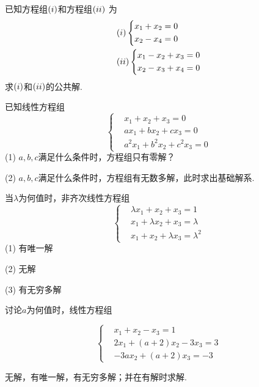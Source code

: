 \begin{ex}\label{5.16}
已知方程组$(\romannumeral 1)$和方程组$(\romannumeral 2)$ 为
\begin{displaymath}\begin{aligned}&
(\romannumeral 1)\left\{ \begin{aligned}&x_1+x_2=0\\&x_2-x_4=0\end{aligned}\right.\\ &
(\romannumeral 2)\left\{ \begin{aligned}&x_1-x_2+x_3=0\\&x_2-x_3+x_4=0\end{aligned}\right.\end{aligned}
\end{displaymath}
求$(\romannumeral 1)$和$(\romannumeral 2)$的公共解.
\end{ex}

\begin{ex}\label{5.17}
已知线性方程组
\begin{displaymath}\left\{\begin{aligned}&x_1+ x_2+ x_3=0\\&ax_1+bx_2+cx_3=0\\&a^2 x_1+b^2 x_2+c^2 x_3=0\end{aligned}\right.\end{displaymath}
(1) $a,b,c$满足什么条件时，方程组只有零解？

(2)  $a,b,c$满足什么条件时，方程组有无数多解，此时求出基础解系.
\end{ex}

\begin{ex}\label{5.18}
当$\lambda$为何值时，非齐次线性方程组
\begin{displaymath}\left\{\begin{aligned}&
\lambda x_1+ x_2+ x_3=1\\& x_1+\lambda x_2+ x_3=\lambda \\& x_1+ x_2+\lambda x_3=\lambda ^2
\end{aligned}\right.\end{displaymath}
(1) 有唯一解

(2) 无解

(3) 有无穷多解
\end{ex}

\begin{ex}\label{5.19}
讨论$a$为何值时，线性方程组

\begin{displaymath}\left\{\begin{aligned}&
x_1+x_2-x_3=1\\&2x_1+(a+2) x_2-3x_3=3\\&-3ax_2+(a+2) x_3=-3
\end{aligned}\right.\end{displaymath}

无解，有唯一解，有无穷多解；并在有解时求解.
\end{ex}

